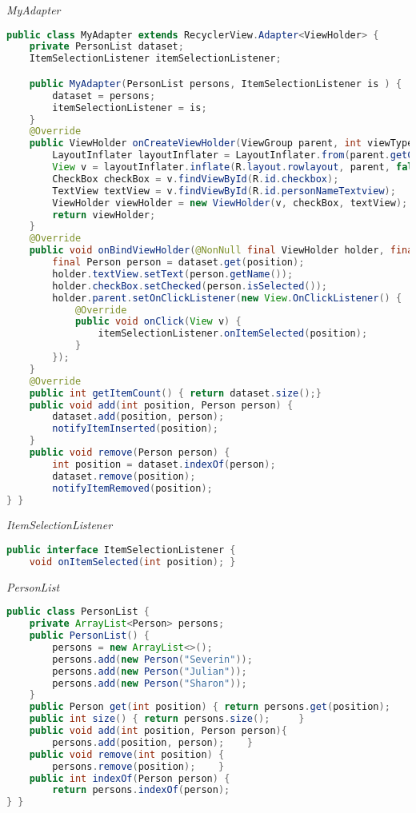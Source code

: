 \textit{MyAdapter}
\begin{lstlisting}[language=java]
public class MyAdapter extends RecyclerView.Adapter<ViewHolder> {
    private PersonList dataset;
    ItemSelectionListener itemSelectionListener;

    public MyAdapter(PersonList persons, ItemSelectionListener is ) {
        dataset = persons;
        itemSelectionListener = is;
    }
    @Override
    public ViewHolder onCreateViewHolder(ViewGroup parent, int viewType) {
        LayoutInflater layoutInflater = LayoutInflater.from(parent.getContext());
        View v = layoutInflater.inflate(R.layout.rowlayout, parent, false);
        CheckBox checkBox = v.findViewById(R.id.checkbox);
        TextView textView = v.findViewById(R.id.personNameTextview);
        ViewHolder viewHolder = new ViewHolder(v, checkBox, textView);
        return viewHolder;
    }
    @Override
    public void onBindViewHolder(@NonNull final ViewHolder holder, final int position) {
        final Person person = dataset.get(position);
        holder.textView.setText(person.getName());
        holder.checkBox.setChecked(person.isSelected());
        holder.parent.setOnClickListener(new View.OnClickListener() {
            @Override
            public void onClick(View v) {
                itemSelectionListener.onItemSelected(position);
            }
        });
    }
    @Override
    public int getItemCount() { return dataset.size();}
    public void add(int position, Person person) {
        dataset.add(position, person);
        notifyItemInserted(position);            
    }
    public void remove(Person person) {
        int position = dataset.indexOf(person);
        dataset.remove(position);
        notifyItemRemoved(position);
} }
\end{lstlisting}

\textit{ItemSelectionListener}
\begin{lstlisting}[language=java]
public interface ItemSelectionListener {
    void onItemSelected(int position); }
\end{lstlisting}
\textit{PersonList}
\begin{lstlisting}[language=java]
public class PersonList {
    private ArrayList<Person> persons;
    public PersonList() {
        persons = new ArrayList<>();
        persons.add(new Person("Severin"));
        persons.add(new Person("Julian"));
        persons.add(new Person("Sharon"));
    }
    public Person get(int position) { return persons.get(position);    }
    public int size() { return persons.size();     }
    public void add(int position, Person person){
        persons.add(position, person);    }
    public void remove(int position) {
        persons.remove(position);    }
    public int indexOf(Person person) {
        return persons.indexOf(person);
} }
\end{lstlisting}

